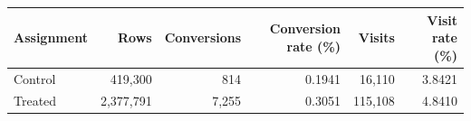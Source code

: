 \begin{tabular}{@{}lrrrrr@{}}
\toprule
Assignment & Rows & Conversions & Conversion rate (\%) & Visits & Visit rate (\%) \\
\midrule
Control & 419,300 & 814 & 0.1941 & 16,110 & 3.8421 \\
Treated & 2,377,791 & 7,255 & 0.3051 & 115,108 & 4.8410 \\
\bottomrule
\end{tabular}
